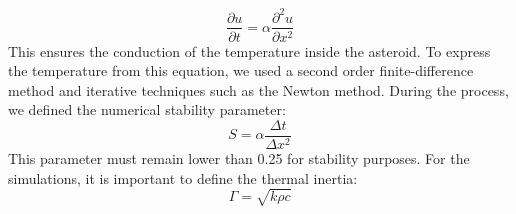\begin{equation}
    \frac{\partial{u}}{\partial{t}}=\alpha\frac{\partial^2{u}}{\partial{x}^2}
    \label{eq:2.6}
\end{equation}
This ensures the conduction of the temperature inside the asteroid. To express the temperature from this equation, we used a second order finite-difference method and iterative techniques such as the Newton method. During the process, we defined the numerical stability parameter:
\begin{equation}
    S=\alpha\frac{\Delta t}{\Delta x^2}
    \label{eq:2.7}
\end{equation}
This parameter must remain lower than 0.25 for stability purposes. For the simulations, it is important to define the thermal inertia:
\begin{equation}
    \Gamma=\sqrt{k\rho c}
    \label{eq:2.8}
\end{equation}
